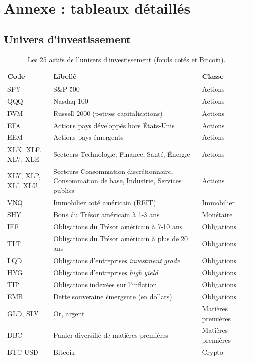 \section{Annexe : tableaux détaillés}
\label{sec:annexes}

\subsection{Univers d'investissement}

\begin{table}[H]
  \centering
  \small
  \caption{Les 25 actifs de l'univers d'investissement (fonds cotés et Bitcoin).}
  \label{tab:univers}
  \begin{tabularx}{\textwidth}{@{}l L l@{}}
    \toprule
    \textbf{Code} & \textbf{Libellé} & \textbf{Classe} \\
    \midrule
    SPY & S\&P 500 & Actions \\
    QQQ & Nasdaq 100 & Actions \\
    IWM & Russell 2000 (petites capitalisations) & Actions \\
    EFA & Actions pays développés hors États-Unis & Actions \\
    EEM & Actions pays émergents & Actions \\
    XLK, XLF, XLV, XLE & Secteurs Technologie, Finance, Santé, Énergie & Actions \\
    XLY, XLP, XLI, XLU & Secteurs Consommation discrétionnaire, Consommation de base, Industrie, Services publics & Actions \\
    VNQ & Immobilier coté américain (REIT) & Immobilier \\
    SHY & Bons du Trésor américain à 1-3 ans & Monétaire \\
    IEF & Obligations du Trésor américain à 7-10 ans & Obligations \\
    TLT & Obligations du Trésor américain à plus de 20 ans & Obligations \\
    LQD & Obligations d'entreprises \emph{investment grade} & Obligations \\
    HYG & Obligations d'entreprises \emph{high yield} & Obligations \\
    TIP & Obligations indexées sur l'inflation & Obligations \\
    EMB & Dette souveraine émergente (en dollars) & Obligations \\
    GLD, SLV & Or, argent & Matières premières \\
    DBC & Panier diversifié de matières premières & Matières premières \\
    BTC-USD & Bitcoin & Crypto \\
    \bottomrule
  \end{tabularx}
\end{table}

